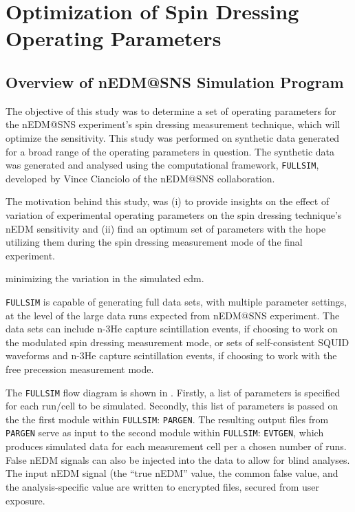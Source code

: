\chapter{Optimization of Spin Dressing Operating Parameters}

\ifpdf
    \graphicspath{{Chapter4/Figs/Raster/}{Chapter4/Figs/PDF/}{Chapter4/Figs/}}
\else
    \graphicspath{{Chapter4/Figs/Vector/}{Chapter1/Figs/}}
\fi

\section{Overview of nEDM@SNS Simulation Program}

The objective of this study was to determine a set of operating parameters for the nEDM@SNS experiment's spin dressing measurement technique, which will optimize the sensitivity. This study was performed on synthetic data generated for a broad range of the operating parameters in question. The synthetic data was generated and analysed using the computational framework, \texttt{FULLSIM}, developed by Vince Cianciolo of the nEDM@SNS collaboration.   

The motivation behind this study, was (i) to provide insights on the effect of variation of experimental operating parameters on the spin dressing technique's nEDM sensitivity and (ii) find an optimum set of parameters with the hope utilizing them during the spin dressing measurement mode of the final experiment.

minimizing the variation in the simulated edm.

\texttt{FULLSIM} is capable of generating full data sets, with multiple parameter settings, at the level of the large data runs expected from nEDM@SNS experiment. The data sets can include n-3He capture scintillation events, if choosing to work on the modulated spin dressing measurement mode, or sets of self-consistent SQUID waveforms and n-3He capture scintillation events, if choosing to work with the free precession measurement mode.

The \texttt{FULLSIM} flow diagram is shown in . Firstly, a list of parameters is specified for each run/cell to be simulated. Secondly, this list of parameters is passed on the the first module within \texttt{FULLSIM}: \texttt{PARGEN}. The resulting output files from \texttt{PARGEN} serve as input to the second module within \texttt{FULLSIM}: \texttt{EVTGEN}, which produces simulated data for each measurement cell per a chosen number of runs. False nEDM signals can also be injected into the data to allow for blind analyses. The input nEDM signal (the “true nEDM” value, the common false value, and the analysis-specific value are written to encrypted files, secured from user exposure. 


